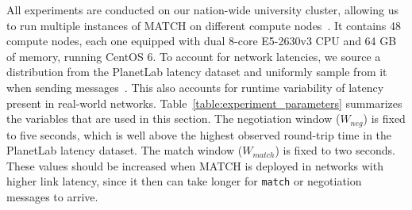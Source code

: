 All experiments are conducted on our nation-wide university cluster, allowing us to run multiple instances of MATCH on different compute nodes~\cite{bal2016medium}.
It contains 48 compute nodes, each one equipped with dual 8-core E5-2630v3 CPU and 64 GB of memory, running CentOS 6.
To account for network latencies, we source a distribution from the PlanetLab latency dataset and uniformly sample from it when sending messages~\cite{zhu2016network}.
This also accounts for runtime variability of latency present in real-world networks.
Table~\ref{table:experiment_parameters} summarizes the variables that are used in this section.
The negotiation window ($ W_{neg} $) is fixed to five seconds, which is well above the highest observed round-trip time in the PlanetLab latency dataset.
The match window ($ W_{match} $) is fixed to two seconds.
These values should be increased when MATCH is deployed in networks with higher link latency, since it then can take longer for \texttt{match} or negotiation messages to arrive.



